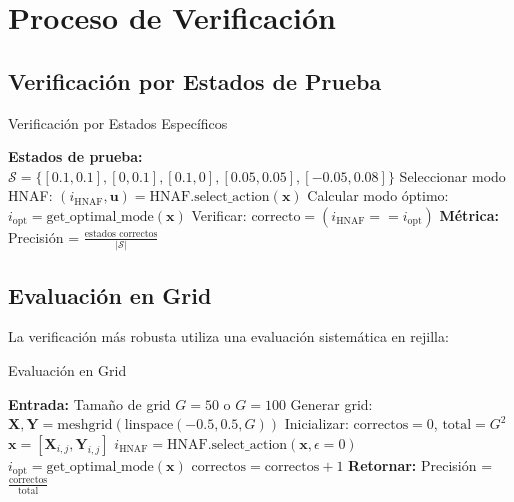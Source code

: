\documentclass[12pt,a4paper]{article}
\begin{document}
\section{Proceso de Verificación}

\subsection{Verificación por Estados de Prueba}

\begin{algorithm}
\caption{Verificación por Estados Específicos}
\begin{algorithmic}[1]
\STATE \textbf{Estados de prueba:} $\mathcal{S} = \{[0.1, 0.1], [0, 0.1], [0.1, 0], [0.05, 0.05], [-0.05, 0.08]\}$
    \STATE Seleccionar modo HNAF: $(i_{\text{HNAF}}, \mathbf{u}) = \text{HNAF.select\_action}(\mathbf{x})$
    \STATE Calcular modo óptimo: $i_{\text{opt}} = \text{get\_optimal\_mode}(\mathbf{x})$
    \STATE Verificar: $\text{correcto} = (i_{\text{HNAF}} == i_{\text{opt}})$
\ENDFOR
\STATE \textbf{Métrica:} Precisión = $\frac{\text{estados correctos}}{|\mathcal{S}|}$
\end{algorithmic}
\end{algorithm}

\subsection{Evaluación en Grid}

La verificación más robusta utiliza una evaluación sistemática en rejilla:

\begin{algorithm}
\caption{Evaluación en Grid}
\begin{algorithmic}[1]
\STATE \textbf{Entrada:} Tamaño de grid $G = 50$ o $G = 100$
\STATE Generar grid: $\mathbf{X}, \mathbf{Y} = \text{meshgrid}(\text{linspace}(-0.5, 0.5, G))$
\STATE Inicializar: $\text{correctos} = 0$, $\text{total} = G^2$
        \STATE $\mathbf{x} = [\mathbf{X}_{i,j}, \mathbf{Y}_{i,j}]$
        \STATE $i_{\text{HNAF}} = \text{HNAF.select\_action}(\mathbf{x}, \epsilon=0)$
        \STATE $i_{\text{opt}} = \text{get\_optimal\_mode}(\mathbf{x})$
            \STATE $\text{correctos} = \text{correctos} + 1$
        \ENDIF
    \ENDFOR
\ENDFOR
\STATE \textbf{Retornar:} Precisión = $\frac{\text{correctos}}{\text{total}}$
\end{algorithmic}
\end{algorithm}
\end{document}
